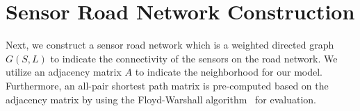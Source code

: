 \begin{table}[h]
\begin{center}
\caption{An example of the day-of-week model.}
\label{tab:day-of-week_Model}
\end{center}
\end{table}
\section{Sensor Road Network Construction}\label{subsubsec:gc}
Next, we construct a sensor road network which is a weighted directed graph $ G(S,L)$ to indicate the connectivity of the sensors on the road network. We utilize an adjacency matrix $A$ to indicate the neighborhood for our model.
Furthermore, an all-pair shortest path matrix is pre-computed based on the adjacency matrix by using the Floyd-Warshall algorithm~\cite{cormen2001ia} for evaluation.


